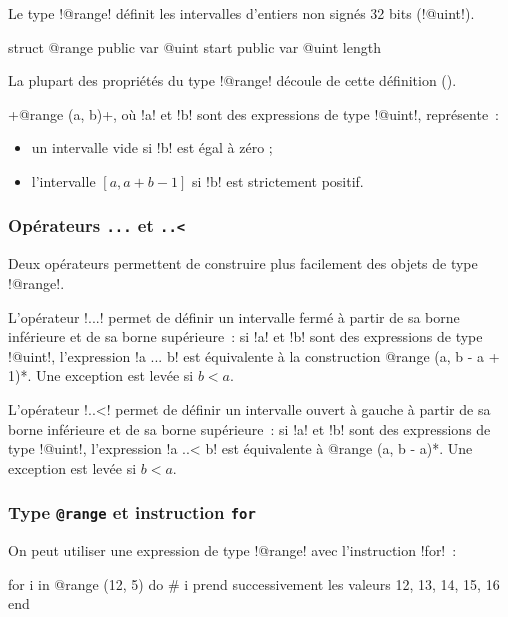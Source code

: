 
Le type \ggsq!@range! définit les intervalles d'entiers non signés 32 bits (\ggsq!@uint!).

\begin{galgas34}
struct @range {
  public var @uint start
  public var @uint length
}
\end{galgas34}

La plupart des propriétés du type \ggsq!@range! découle de cette définition ().

\ggsq+@range (a, b)+, où \ggsq!a! et \ggsq!b! sont des expressions de type \ggsq!@uint!, représente~:
\begin{itemize}
  \item un intervalle vide si \ggsq!b! est égal à zéro ;
  \item l'intervalle $[a, a+b-1]$ si \ggsq!b! est strictement positif.
\end{itemize}



\subsubsection{Opérateurs \texttt{.{}.{}.} et \texttt{.{}.{}<}}

Deux opérateurs permettent de construire plus facilement des objets de type \ggsq!@range!.

L'opérateur \ggsq!...! permet de définir un intervalle fermé à partir de sa borne inférieure et de sa borne supérieure~: si \ggsq!a! et \ggsq!b! sont des expressions de type \ggsq!@uint!, l'expression \ggsq!a ... b! est équivalente à la construction \ggsq*@range (a, b - a + 1)*. Une exception est levée si $b < a$.

L'opérateur \ggsq!..<! permet de définir un intervalle ouvert à gauche à partir de sa borne inférieure et de sa borne supérieure~: si \ggsq!a! et \ggsq!b! sont des expressions de type \ggsq!@uint!, l'expression \ggsq!a ..< b! est équivalente à \ggsq*@range (a, b - a)*. Une exception est levée si $b < a$.

\subsubsection{Type \texttt{@range} et instruction \texttt{for}}

On peut utiliser une expression de type \ggsq!@range! avec l'instruction \ggsq!for!~:

\begin{galgas34}
for i in @range (12, 5) do
  # i prend successivement les valeurs 12, 13, 14, 15, 16
end
\end{galgas34}

